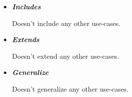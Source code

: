\begin{itemize}
\begin{itemize}

\item {\bf \em Includes}
\par \noindent
Doesn't include any other use-cases.

\item {\bf \em Extends}
\par \noindent
Doesn't extend any other use-cases.

\item {\bf \em Generalize}
\par \noindent
Doesn't generalize any other use-cases.

\end{itemize}

\end{itemize}

